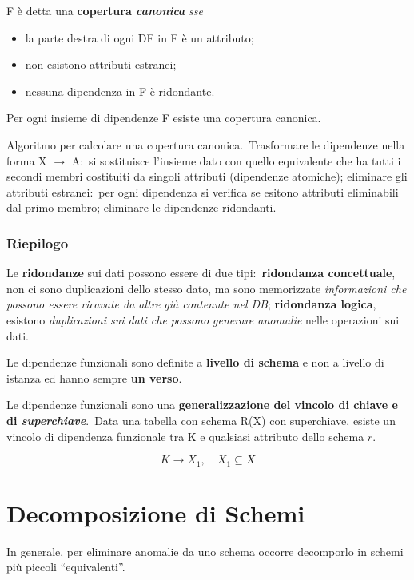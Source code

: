 \noindent F è detta una \textbf{copertura \textit{canonica}} \textit{sse}
\begin{itemize}
	\item la parte destra di ogni DF in F è un attributo;
	\item non esistono attributi estranei;
	\item nessuna dipendenza in F è ridondante.
\end{itemize}

\begin{theorem}
	Per ogni insieme di dipendenze F esiste una copertura canonica.\
\end{theorem}

\noindent Algoritmo per calcolare una copertura canonica.\
Trasformare le dipendenze nella forma X $\rightarrow$ A:\ si sostituisce l'insieme dato con quello equivalente che ha tutti i secondi membri costituiti da singoli attributi (dipendenze atomiche); eliminare gli attributi estranei:\ per ogni dipendenza si verifica se esitono attributi eliminabili dal primo membro; eliminare le dipendenze ridondanti.\

\subsubsection{Riepilogo}

Le \textbf{ridondanze} sui dati possono essere di due tipi:\ \textbf{ridondanza concettuale}, non ci sono duplicazioni dello stesso dato, ma sono memorizzate \textit{informazioni che possono essere ricavate da altre già contenute nel DB}; \textbf{ridondanza logica}, esistono \textit{duplicazioni sui dati che possono generare anomalie} nelle operazioni sui dati.\

Le dipendenze funzionali sono definite a \textbf{livello di schema} e non a livello di istanza ed hanno sempre \textbf{un verso}.\

Le dipendenze funzionali sono una \textbf{generalizzazione del vincolo di chiave e di \textit{superchiave}}.\
Data una tabella con schema R(X) con superchiave, esiste un vincolo di dipendenza funzionale tra K e qualsiasi attributo dello schema $r$.\

\[
	K \rightarrow X_1,\quad X_1 \subseteq X
\]

\section{Decomposizione di Schemi}

In generale, per eliminare anomalie da uno schema occorre decomporlo in schemi più piccoli ``equivalenti''.\


